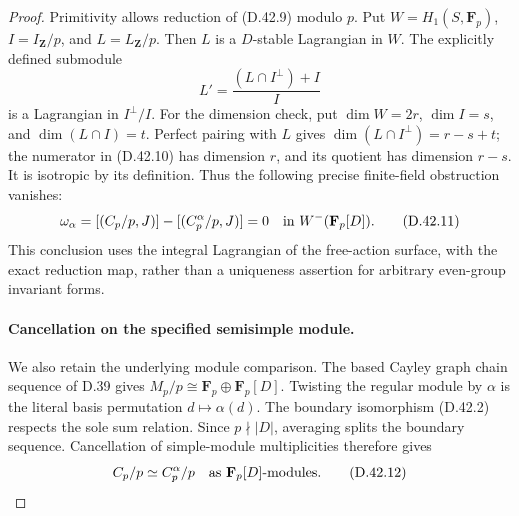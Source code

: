 \begin{proof}
Primitivity allows reduction of
\textup{(D.42.9)} modulo \(p\).
Put \(W=H_1(S,\mathbf F_p)\), \(I=I_{\mathbf Z}/p\),
and \(L=L_{\mathbf Z}/p\).
Then \(L\) is a \(D\)-stable Lagrangian in \(W\).
The explicitly defined submodule
\[
                  L'=\frac{(L\cap I^\perp)+I}{I}
 \tag{D.42.10}
\]
is a Lagrangian in \(I^\perp/I\).
For the dimension check, put
\(\dim W=2r\), \(\dim I=s\), and
\(\dim(L\cap I)=t\).
Perfect pairing with \(L\) gives
\(\dim(L\cap I^\perp)=r-s+t\);
the numerator in \textup{(D.42.10)} has dimension
\(r\), and its quotient has dimension \(r-s\).
It is isotropic by its definition.
Thus the following precise finite-field obstruction
vanishes:
\[
 \omega_\alpha
   =[(C_p/p,J)]-[(C_p^\alpha/p,J)]
   =0
   \quad\hbox{in }W^-(\mathbf F_p[D]).
 \tag{D.42.11}
\]
This conclusion uses the integral Lagrangian of the
free-action surface, with the exact reduction map,
rather than a uniqueness assertion for arbitrary
even-group invariant forms.

\paragraph{Cancellation on the specified semisimple module.}
We also retain the underlying module comparison.
The based Cayley graph chain sequence of D.39 gives
\(M_p/p\cong\mathbf F_p\oplus\mathbf F_p[D]\).
Twisting the regular module by \(\alpha\) is the
literal basis permutation \(d\mapsto\alpha(d)\).
The boundary isomorphism \textup{(D.42.2)} respects
the sole sum relation.
Since \(p\nmid |D|\), averaging splits the boundary
sequence.  Cancellation of simple-module
multiplicities therefore gives
\[
                   C_p/p\simeq C_p^\alpha/p
                    \quad\hbox{as }\mathbf F_p[D]\text{-modules}.
 \tag{D.42.12}
\]


\end{proof}

